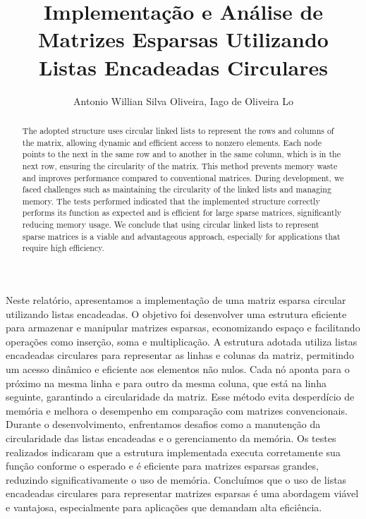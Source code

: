 \documentclass[12pt]{article}
\title{Implementação e Análise de Matrizes Esparsas Utilizando Listas Encadeadas Circulares}
\author{Antonio Willian Silva Oliveira\inst{1}, Iago de Oliveira Lo\inst{2}}
\begin{document}
 

\maketitle

\begin{abstract}
  The adopted structure uses circular linked lists to represent the rows and columns of the matrix, allowing dynamic and efficient access to nonzero elements. Each node points to the next in the same row and to another in the same column, which is in the next row, ensuring the circularity of the matrix. This method prevents memory waste and improves performance compared to conventional matrices.
During development, we faced challenges such as maintaining the circularity of the linked lists and managing memory. The tests performed indicated that the implemented structure correctly performs its function as expected and is efficient for large sparse matrices, significantly reducing memory usage.
We conclude that using circular linked lists to represent sparse matrices is a viable and advantageous approach, especially for applications that require high efficiency.
\end{abstract}
     
\begin{resumo} 
  Neste relatório, apresentamos a implementação de uma matriz esparsa circular utilizando listas encadeadas. O objetivo foi desenvolver uma estrutura eficiente para armazenar e manipular matrizes esparsas, economizando espaço e facilitando operações como inserção, soma e multiplicação.
A estrutura adotada utiliza listas encadeadas circulares para representar as linhas e colunas da matriz, permitindo um acesso dinâmico e eficiente aos elementos não nulos. Cada nó aponta para o próximo na mesma linha e para outro da mesma coluna, que está na linha seguinte, garantindo a circularidade da matriz. Esse método evita desperdício de memória e melhora o desempenho em comparação com matrizes convencionais.
Durante o desenvolvimento, enfrentamos desafios como a manutenção da circularidade das listas encadeadas e o gerenciamento da memória. Os testes realizados indicaram que a estrutura implementada executa corretamente sua função conforme o esperado e é eficiente para matrizes esparsas grandes, reduzindo significativamente o uso de memória.
Concluímos que o uso de listas encadeadas circulares para representar matrizes esparsas é uma abordagem viável e vantajosa, especialmente para aplicações que demandam alta eficiência.
\end{resumo}
\end{document}
